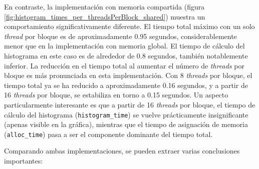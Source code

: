         En contraste, la implementación con memoria compartida (figura \ref{fig:histogram_times_per_threadsPerBlock_shared}) muestra un comportamiento significativamente diferente. El tiempo total máximo con un solo \textit{thread} por bloque es de aproximadamente 0.95 segundos, considerablemente menor que en la implementación con memoria global. El tiempo de cálculo del histograma en este caso es de alrededor de 0.8 segundos, también notablemente inferior.
        La reducción en el tiempo total al aumentar el número de \textit{threads} por bloque es más pronunciada en esta implementación. Con 8 \textit{threads} por bloque, el tiempo total ya se ha reducido a aproximadamente 0.16 segundos, y a partir de 16 \textit{threads} por bloque, se estabiliza en torno a 0.15 segundos. Un aspecto particularmente interesante es que a partir de 16 \textit{threads} por bloque, el tiempo de cálculo del histograma (\texttt{histogram\_time}) se vuelve prácticamente insignificante (apenas visible en la gráfica), mientras que el tiempo de asignación de memoria (\texttt{alloc\_time}) pasa a ser el componente dominante del tiempo total.
        
        Comparando ambas implementaciones, se pueden extraer varias conclusiones importantes:

